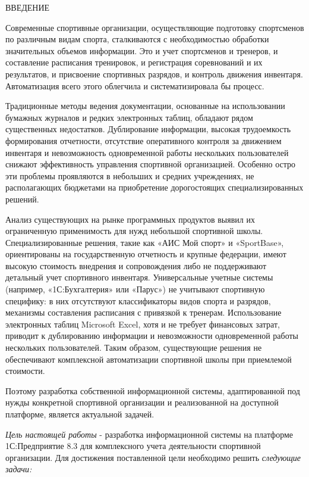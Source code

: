 \newpage
\begin{center}
	{ВВЕДЕНИЕ}
\end{center}

Современные спортивные организации, осуществляющие подготовку спортсменов по различным видам спорта, сталкиваются с необходимостью обработки значительных объемов информации. Это и учет спортсменов и тренеров, и составление расписания тренировок, и регистрация соревнований и их результатов, и присвоение спортивных разрядов, и контроль движения инвентаря. Автоматизация всего этого облегчила и систематизировала бы процесс.

Традиционные методы ведения документации, основанные на использовании бумажных журналов и редких электронных таблиц, обладают рядом существенных недостатков. Дублирование информации, высокая трудоемкость формирования отчетности, отсутствие оперативного контроля за движением инвентаря и невозможность одновременной работы нескольких пользователей снижают эффективность управления спортивной организацией. Особенно остро эти проблемы проявляются в небольших и средних учреждениях, не располагающих бюджетами на приобретение дорогостоящих специализированных решений.

Анализ существующих на рынке программных продуктов выявил их ограниченную применимость для нужд небольшой спортивной школы. Специализированные решения, такие как «АИС Мой спорт» и «SportBase», ориентированы на государственную отчетность и крупные федерации, имеют высокую стоимость внедрения и сопровождения либо не поддерживают детальный учет спортивного инвентаря. Универсальные учетные системы (например, «1С:Бухгалтерия» или «Парус») не учитывают спортивную специфику: в них отсутствуют классификаторы видов спорта и разрядов, механизмы составления расписания с привязкой к тренерам. Использование электронных таблиц Microsoft Excel, хотя и не требует финансовых затрат, приводит к дублированию информации и невозможности одновременной работы нескольких пользователей. Таким образом, существующие решения не обеспечивают комплексной автоматизации спортивной школы при приемлемой стоимости.

Поэтому разработка собственной информационной системы, адаптированной под нужды конкретной спортивной организации и реализованной на доступной платформе, является актуальной задачей.

\textit{Цель настоящей работы} - разработка информационной системы на платформе 1С:Предприятие 8.3 для комплексного учета деятельности спортивной организации. Для достижения поставленной цели необходимо решить \textit{следующие задачи:}

